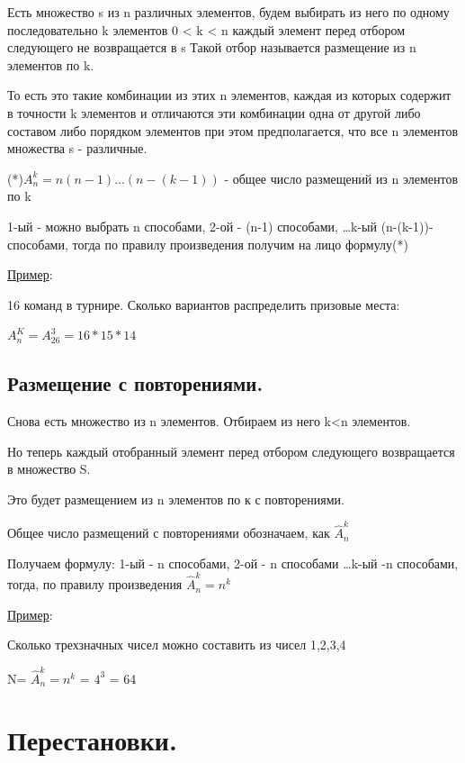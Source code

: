 \documentclass[12pt, a4paper]{article}
\begin{document}
Есть множество s  из n различных элементов, будем выбирать из него по одному последовательно k элементов 0 < k < n каждый элемент перед отбором следующего не возвращается в s Такой отбор называется размещение из n элементов по k. 

То есть это такие комбинации из этих n элементов, каждая из которых содержит в точности k элементов и отличаются эти комбинации одна от другой либо составом либо порядком элементов при этом предполагается, что все n элементов множества s - различные. 

(*)$A_n^k = n (n-1) \dots (n-(k - 1))$ - общее число размещений из n элементов по k 

1-ый - можно выбрать n способами, 2-ой - (n-1) способами, \dots k-ый (n-(k-1))- способами, тогда по правилу произведения получим на лицо формулу(*)

\underline{Пример}:

16 команд в турнире. Сколько вариантов распределить призовые места:

$A_n^K = A_{26}^3 = 16*15*14$

\subsection{Размещение с повторениями.}

Снова есть множество из n элементов. Отбираем из него k<n элементов. 

Но теперь каждый отобранный элемент перед отбором следующего возвращается в множество S. 

Это будет размещением из n элементов по к с повторениями.



Общее число размещений с повторениями обозначаем, как $\hat{A}_n^k$

Получаем формулу: 1-ый - n способами, 2-ой - n  способами \dots k-ый -n способами, тогда, по правилу произведения  $\hat{A}_n^k = n^k$

\underline{Пример}:

Сколько трехзначных чисел можно составить из чисел 1,2,3,4



N= $\hat{A}_n^k = n^k$ = $4^3$ = 64

\section{Перестановки.}
\end{document}
